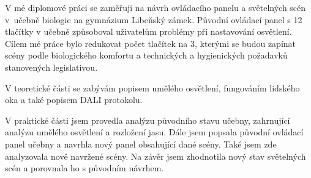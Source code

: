 \medskip
V mé diplomové práci se zaměřuji na návrh ovládacího panelu a světelných scén v~učebně biologie na
gymnázium Libeňský zámek. Původní ovládací panel s 12 tlačítky v učebně způsoboval uživatelům problémy při
nastavování osvětlení. Cílem mé práce bylo redukovat počet tlačítek na 3, kterými se budou zapínat scény
podle biologického komfortu a technických a hygienických požadavků stanovených legislativou.

\medskip
V teoretické části se zabývám popisem umělého osvětlení, fungováním lidského oka a také popisem DALI protokolu.

\medskip
V praktické části jsem provedla analýzu původního stavu učebny, zahrnující analýzu umělého osvětlení a
rozložení jasu. Dále jsem popsala původní ovládací panel učebny a navrhla nový panel obsahující dané scény.
Také jsem zde analyzovala nově navržené scény. Na závěr jsem zhodnotila nový stav světelných scén a porovnala ho s původním návrhem.




